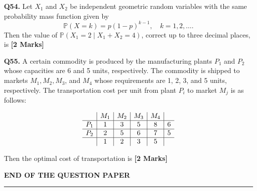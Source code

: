 \documentclass[11pt]{article}
\newcommand{\questionb}[2]{
    \noindent\textbf{Q#2.} #1 \hfill \textbf{[2 Marks]}
}
\begin{document}
\questionb{Let \( X_1 \) and \( X_2 \) be independent geometric random variables with the same probability mass function given by
\[
\mathbb{P}(X = k) = p(1 - p)^{k - 1}, \quad k = 1, 2, \ldots.
\]
Then the value of \( \mathbb{P}(X_1 = 2 \mid X_1 + X_2 = 4) \), correct up to three decimal places, is}{54}
\vspace{0.5cm}

\questionb{A certain commodity is produced by the manufacturing plants \( P_1 \) and \( P_2 \) whose capacities are 6 and 5 units, respectively. The commodity is shipped to markets \( M_1, M_2, M_3 \), and \( M_4 \) whose requirements are 1, 2, 3, and 5 units, respectively. The transportation cost per unit from plant \( P_i \) to market \( M_j \) is as follows:

\[
\begin{array}{c|c|c|c|c|c}
 & M_1 & M_2 & M_3 & M_4 & \\
\hline
P_1 & 1 & 3 & 5 & 8 & 6\\
\hline
P_2 & 2 & 5 & 6 & 7 & 5\\
\hline
& 1 & 2 &3 &5
\end{array}
\]

Then the optimal cost of transportation is}{55}
\vspace{0.5cm}

\vspace{5cm}
\begin{center}
\textbf{END OF THE QUESTION PAPER} \\
\rule{\textwidth}{0.5pt}
\end{center}
\end{document}
